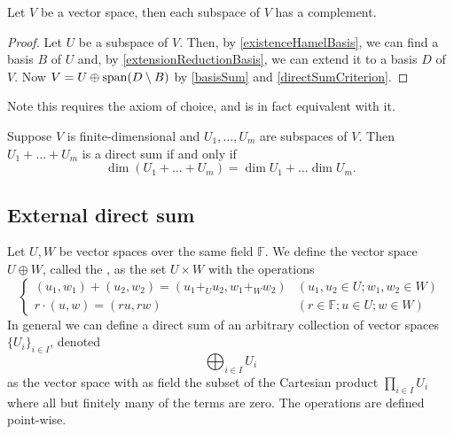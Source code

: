\begin{proposition}
Let $V$ be a vector space, then each subspace of $V$ has a complement.
\end{proposition}
\begin{proof}
Let $U$ be a subspace of $V$. Then, by \ref{existenceHamelBasis}, we can find a basis $B$ of $U$ and, by \ref{extensionReductionBasis}, we can extend it to a basis $D$ of $V$. Now $V = U \oplus \operatorname{span}(D\setminus B)$ by \ref{basisSum} and \ref{directSumCriterion}.
\end{proof}
Note this requires the axiom of choice, and is in fact equivalent with it.
\begin{corollary}
Suppose $V$ is finite-dimensional and $U_1,\ldots, U_m$ are subspaces of $V$. Then $U_1+\ldots+ U_m$ is a direct sum \textup{if and only if}
\[ \dim(U_1+\ldots+U_m) = \dim U_1 + \ldots \dim U_m. \]
\label{directSumDimensionCriterion}
\end{corollary}

\subsection{External direct sum}
\begin{definition}
Let $U,W$ be vector spaces over the same field $\mathbb{F}$. We define the vector space  $U\oplus W$, called the , as the set $U\times W$ with the operations
\[ \begin{cases}
(u_1,w_1) + (u_2, w_2) = (u_1 +_U u_2, w_1 +_W w_2) & (u_1,u_2 \in U; w_1, w_2 \in W) \\
r\cdot (u,w) = (ru, rw) & (r\in \mathbb{F}; u\in U; w \in W)
\end{cases} \]
In general we can define a direct sum of an arbitrary collection of vector spaces $\{U_i\}_{i\in I}$, denoted
\[ \bigoplus_{i\in I}U_i \]
as the vector space with as field the subset of the Cartesian product $\prod_{i\in I}U_i$ where all but finitely many of the terms are zero. The operations are defined point-wise.
\end{definition}

